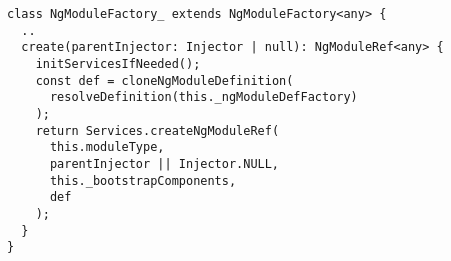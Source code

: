 \begin{verbatim}
class NgModuleFactory_ extends NgModuleFactory<any> {
  ..
  create(parentInjector: Injector | null): NgModuleRef<any> {
    initServicesIfNeeded();
    const def = cloneNgModuleDefinition(
      resolveDefinition(this._ngModuleDefFactory)
    );
    return Services.createNgModuleRef(
      this.moduleType,
      parentInjector || Injector.NULL,
      this._bootstrapComponents,
      def
    );
  }
}
\end{verbatim}
